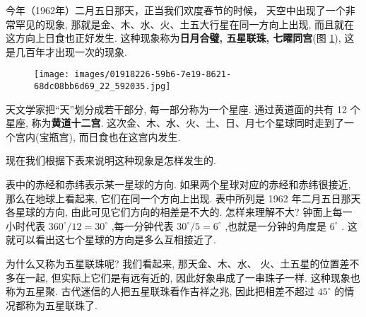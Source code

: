 \documentclass{ctexart}
\begin{document}
今年（1962年）二月五日那天，正当我们欢度春节的时候， 天空中出现了一个非常罕见的现象, 那就是金、木、水、火、土五大行星在同一方向上出现, 而且就在这方向上日食也正好发生. 这种现象称为\textbf{日月合璧, 五星联珠, 七曜同宫}(图 \ref{fig:2}), 这是几百年才出现一次的现象.

\begin{figure}[th]
\begin{center}
  \texttt{[image: images/01918226-59b6-7e19-8621-68dc08bb6d69\_22\_592035.jpg]}
  \caption{\label{fig:2}}
\end{center}
\end{figure}

天文学家把“天”划分成若干部分, 每一部分称为一个星座. 通过黄道面的共有 12 个星座, 称为\textbf{黄道十二宫}. 这次金、木、水、火、土、日、月七个星球同时走到了一个宫内(宝瓶宫), 而日食也在这宫内发生.

现在我们根据下表来说明这种现象是怎样发生的.

\begin{center}
\end{center}

表中的赤经和赤纬表示某一星球的方向. 如果两个星球对应的赤经和赤纬很接近, 那么在地球上看起来, 它们在同一个方向上出现. 表中所列是 1962 年二月五日那天各星球的方向, 由此可见它们方向的相差是不大的. 怎样来理解不大? 钟面上每一小时代表 \({360}^{ \circ }/{12} = {30}^{ \circ }\) ,每一分钟代表 \({30}^{ \circ }/5 = {6}^{ \circ }\) ,也就是一分钟的角度是 \({6}^{ \circ }\) . 这就可以看出这七个星球的方向是多么互相接近了.

为什么又称为五星联珠呢? 我们看起来, 那天金、木、水、 火、土五星的位置差不多在一起, 但实际上它们是有远有近的, 因此好象串成了一串珠子一样. 这种现象也称为五星聚. 古代迷信的人把五星联珠看作吉祥之兆, 因此把相差不超过 \({45}^{ \circ }\) 的情况都称为五星联珠了.
\end{document}

